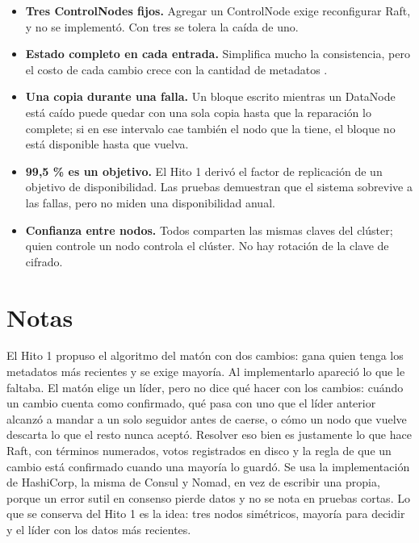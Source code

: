 \documentclass[10pt]{article}
\begin{document}
\begin{itemize}
\item \textbf{Tres ControlNodes fijos.} Agregar un ControlNode exige reconfigurar Raft, y no se implementó. Con tres se tolera la caída de uno.
\item \textbf{Estado completo en cada entrada.} Simplifica mucho la consistencia, pero el costo de cada cambio crece con la cantidad de metadatos .
\item \textbf{Una copia durante una falla.} Un bloque escrito mientras un DataNode está caído puede quedar con una sola copia hasta que la reparación lo complete; si en ese intervalo cae también el nodo que la tiene, el bloque no está disponible hasta que vuelva.
\item \textbf{99,5 \% es un objetivo.} El Hito 1 derivó el factor de replicación de un objetivo de disponibilidad. Las pruebas demuestran que el sistema sobrevive a las fallas, pero no miden una disponibilidad anual.
\item \textbf{Confianza entre nodos.} Todos comparten las mismas claves del clúster; quien controle un nodo controla el clúster. No hay rotación de la clave de cifrado.
\end{itemize}

\separador

\section{Notas}

 El Hito 1 propuso el algoritmo del matón con dos cambios: gana quien tenga los metadatos más recientes y se exige mayoría. Al implementarlo apareció lo que le faltaba. El matón elige un líder, pero no dice qué hacer con los cambios: cuándo un cambio cuenta como confirmado, qué pasa con uno que el líder anterior alcanzó a mandar a un solo seguidor antes de caerse, o cómo un nodo que vuelve descarta lo que el resto nunca aceptó. Resolver eso bien es justamente lo que hace Raft, con términos numerados, votos registrados en disco y la regla de que un cambio está confirmado cuando una mayoría lo guardó. Se usa la implementación de HashiCorp, la misma de Consul y Nomad, en vez de escribir una propia, porque un error sutil en consenso pierde datos y no se nota en pruebas cortas. Lo que se conserva del Hito 1 es la idea: tres nodos simétricos, mayoría para decidir y el líder con los datos más recientes.
\end{document}
